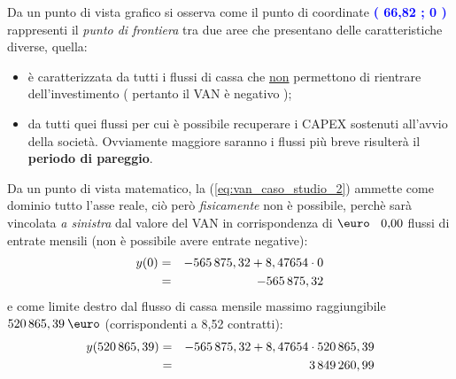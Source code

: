 Da un punto di vista grafico si osserva come il punto di coordinate \textbf{\textcolor{blue}{( 66,82 ; 0 )}} rappresenti il \textit{punto di frontiera} tra due aree che presentano delle caratteristiche diverse, quella:
\begin{itemize}
\item \textbf{\color{red}{rossa}} è caratterizzata da tutti i flussi di cassa che \underline{non} permettono di rientrare dell'investimento ( pertanto il VAN è negativo );
\item \textbf{\color{green}{verde}} da tutti quei flussi per cui è possibile recuperare i CAPEX sostenuti all'avvio della società. Ovviamente maggiore saranno i flussi più breve risulterà il \textbf{periodo di pareggio}.
\end{itemize}


\newline
Da un punto di vista matematico, la (\ref{eq:van_caso_studio_2}) ammette come dominio tutto l'asse reale, ciò però \textit{fisicamente} non è possibile, perchè sarà vincolata \textit{a sinistra} dal valore del VAN in corrispondenza di $\mbox{\euro \: 0,00}$ flussi di entrate mensili (non è possibile avere entrate negative):  
	\begin{eqnarray}
	\label{eq:limite_sinistro}
 		y(0) & = & -565\thinspace 875,32 + 8,47654 \cdot 0 \nonumber \\
 								& = & -565\thinspace 875,32
	\end{eqnarray}
e come limite destro dal flusso di cassa mensile massimo raggiungibile $520\thinspace 865,39 \: \mbox{\euro}$ (corrispondenti a 8,52 contratti):
	\begin{eqnarray}
	\label{eq:limite_superiore}
 		y(520\thinspace 865,39) & = & -565\thinspace 875,32 + 8,47654 \cdot 520\thinspace 865,39 \nonumber \\
 								& = & 3\thinspace 849\thinspace 260,99
	\end{eqnarray}
	
